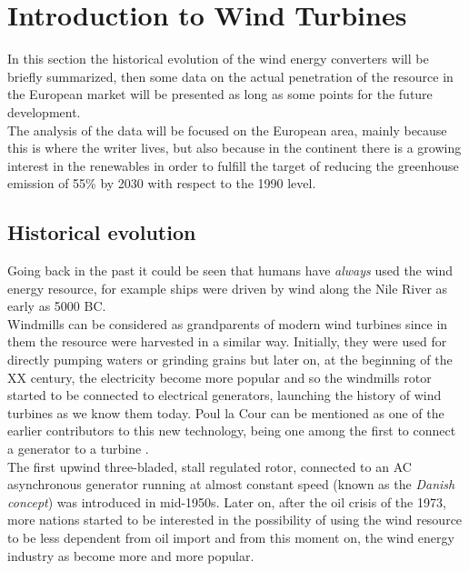 \newpage
\section{Introduction to Wind Turbines}\label{sec:c_WT_characteristics}
In this section the historical evolution of the wind energy converters will be briefly summarized, then some data on the actual penetration of the resource in the European market will be presented as long as some points for the future development. \\
The analysis of the data will be focused on the European area, mainly because this is where the writer lives, but also because in the continent there is a growing interest in the renewables in order to fulfill the target of reducing the greenhouse emission of 55\% by 2030 with respect to the 1990 level. 

\subsection{Historical evolution}
Going back in the past it could be seen that humans have \textit{always} used the wind energy resource, for example ships were driven by wind along the Nile River as early as 5000 BC.\\
Windmills can be considered as grandparents of modern wind turbines since in them the resource were harvested in a similar way. Initially, they were used for directly pumping waters or grinding grains but later on, at the beginning of the XX century, the electricity become more popular and so the windmills rotor started to be connected to electrical generators, launching the history of wind turbines as we know them today. Poul la Cour can be mentioned as one of the earlier contributors to this new technology, being one among the first to connect a generator to a turbine \cite{Aerodynamics_of_wind_turbines}. \\
The first upwind three-bladed, stall regulated rotor, connected to an AC asynchronous generator running at almost constant speed (known as the \textit{Danish concept}) was introduced in mid-1950s. Later on, after the oil crisis of the 1973, more nations started to be interested in the possibility of using the wind resource to be less dependent from oil import and from this moment on, the wind energy industry as become more and more popular. 

